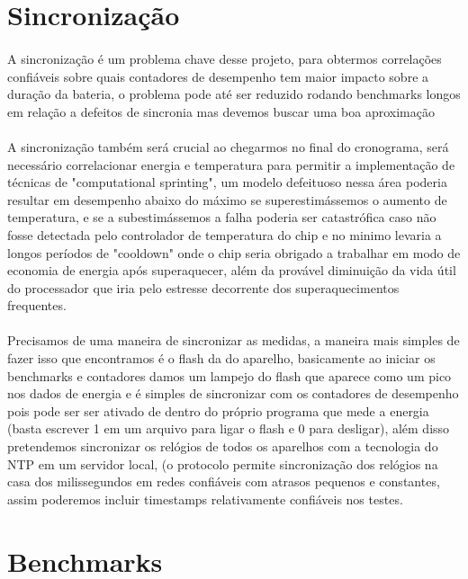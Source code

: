 \documentclass[11pt,a4paper,titlepage]{article}
\begin{document}
\section{Sincronização}
\paragraph{} A sincronização é um problema chave desse projeto, para obtermos correlações confiáveis sobre quais contadores de desempenho tem maior impacto sobre a duração da bateria, o problema pode até ser reduzido rodando benchmarks longos em relação a defeitos de sincronia mas devemos buscar uma boa aproximação
\paragraph{} A sincronização também será crucial ao chegarmos no final do cronograma, será necessário correlacionar energia e temperatura para permitir a implementação de técnicas de "computational sprinting", um modelo defeituoso nessa área poderia resultar em desempenho abaixo do máximo se superestimássemos o aumento de temperatura, e se a subestimássemos a falha poderia ser catastrófica caso não fosse detectada pelo controlador de temperatura do chip e no minimo levaria a longos períodos de "cooldown" onde o chip seria obrigado a trabalhar em modo de economia de energia após  superaquecer, além da provável diminuição da vida útil do processador que iria pelo estresse decorrente dos superaquecimentos frequentes.
\paragraph{} Precisamos de uma maneira de sincronizar as medidas, a maneira mais simples de fazer isso que encontramos é o flash da  do aparelho, basicamente ao iniciar os benchmarks e contadores damos um lampejo do flash que aparece como um pico nos dados de energia e é simples de sincronizar com os contadores de desempenho pois pode ser ser ativado de dentro do próprio programa que mede a energia (basta escrever 1 em um arquivo para ligar o flash e 0 para desligar), além disso pretendemos sincronizar os relógios de todos os aparelhos com a tecnologia do NTP em um servidor local, (o protocolo permite sincronização dos relógios na casa dos milissegundos em redes confiáveis com atrasos pequenos e constantes, assim poderemos incluir timestamps relativamente confiáveis nos testes.

\section{Benchmarks} 
\end{document}
